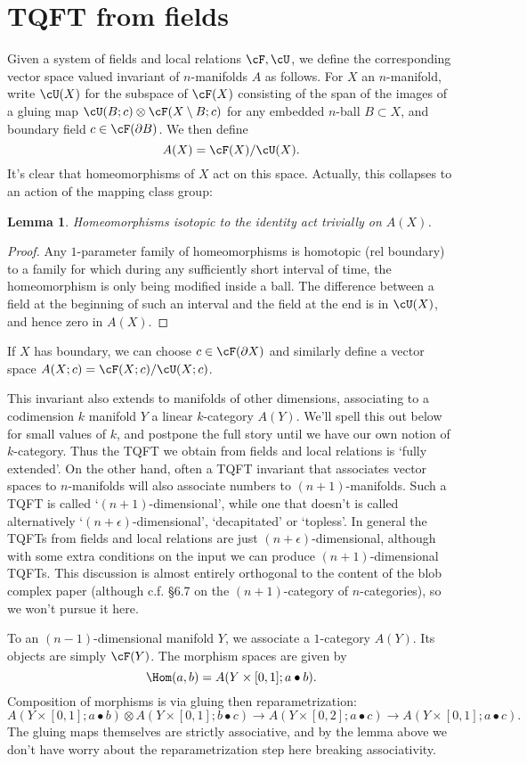 \documentclass[11pt]{amsart}
\theoremstyle{plain}
\newtheorem{lem}[prop]{Lemma}
\newcommand{\bdy}{\partial}
\newcommand{\tensor}{\otimes}
\begin{document}
\section{TQFT from fields}
Given a system of fields and local relations $\cF, \cU$, we define the corresponding vector space valued invariant of $n$-manifolds $A$ as follows. For $X$ an $n$-manifold, write $\cU(X)$ for the subspace of $\cF(X)$ consisting of the span of the images of a gluing map $\cU(B; c) \tensor \cF(X \setminus B; c)$ for any embedded $n$-ball $B \subset X$, and boundary field $c \in \cF(\bdy B)$. We then define
$$A(X) = \cF(X) / \cU(X).$$
It's clear that homeomorphisms of $X$ act on this space. Actually, this collapses to an action of the mapping class group:
\begin{lem}
Homeomorphisms isotopic to the identity act trivially on $A(X)$.
\end{lem}
\begin{proof}
Any $1$-parameter family of homeomorphisms is homotopic (rel boundary) to a family for which during any sufficiently short interval of time, the homeomorphism is only being modified inside a ball. The difference between a field at the beginning of such an interval and the field at the end is in $\cU(X)$, and hence zero in $A(X)$.
\end{proof}


If $X$ has boundary, we can choose $c \in \cF(\bdy X)$ and similarly define a vector space $A(X; c) = \cF(X; c) / \cU(X; c)$.

This invariant also extends to manifolds of other dimensions, associating to a codimension $k$ manifold $Y$ a linear $k$-category $A(Y)$. We'll spell this out below for small values of $k$, and postpone the full story until we have our own notion of $k$-category. Thus the TQFT we obtain from fields and local relations is `fully extended'. On the other hand, often a TQFT invariant that associates vector spaces to $n$-manifolds will also associate numbers to $(n+1)$-manifolds.  Such a TQFT is called `$(n+1)$-dimensional', while one that doesn't is called alternatively `$(n+\epsilon)$-dimensional', `decapitated' or `topless'. In general the TQFTs from fields and local relations are just $(n+\epsilon)$-dimensional, although with some extra conditions on the input we can produce $(n+1)$-dimensional TQFTs. This discussion is almost entirely orthogonal to the content of the blob complex paper (although c.f. \S 6.7 on the $(n+1)$-category of $n$-categories), so we won't pursue it here.

To an $(n-1)$-dimensional manifold $Y$, we associate a $1$-category $A(Y)$. Its objects are simply $\cF(Y)$. The morphism spaces are given by $$\Hom(a,b) = A(Y \times [0,1]; a \bullet b).$$
Composition of morphisms is via gluing then reparametrization:
$$A(Y \times [0,1]; a \bullet b) \tensor A(Y \times [0,1]; b \bullet c) \to A(Y \times [0,2]; a \bullet c) \to A(Y \times [0,1]; a \bullet c).$$
The gluing maps themselves are strictly associative, and by the lemma above we don't have worry about the reparametrization step here breaking associativity.
\end{document}
